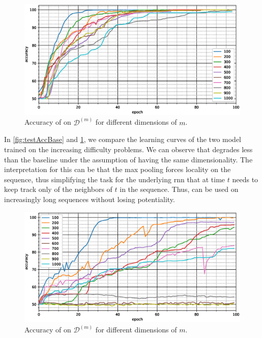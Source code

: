 \begin{figure}
  \centering
  \includegraphics[width=\floatwidth]{imgMax/accuracy-max.eps}
  \caption{Accuracy of \maxi{} on $\mathcal{D}^{(m)}$ for different dimensions of $m$.}
  \label{fig:testAccMax}
\end{figure}

In \cref{fig:testAccBase} and \cref{fig:testAccMax}, we compare
the learning curves of the two model trained on the increasing
difficulty problems. We can observe 
that \maxp{} degrades less than the baseline under the assumption of
having the same dimensionality. The interpretation for this can be
that the max pooling forces locality on the sequence, thus simplifying
the task for the underlying \ac{rnn} that at time $t$ needs to keep
track only of the neighbors of $t$ in the sequence. Thus, \maxp{} can
be used on increasingly long sequences without losing potentiality.

\begin{figure}
  \centering
  \includegraphics[width=\floatwidth]{imgMax/accuracy-int.eps}
  \caption{Accuracy of \maxi{} on $\mathcal{D}^{(m)}$ for different dimensions of $m$.}
  \label{fig:testAccInt}
\end{figure}

